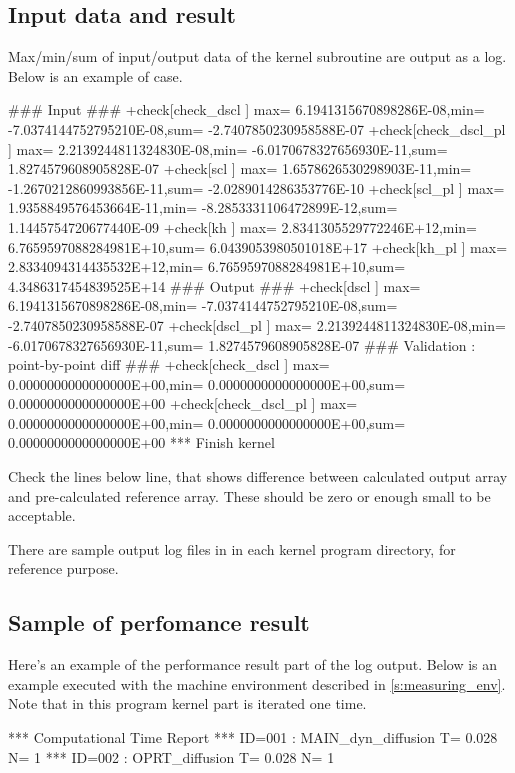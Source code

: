\subsection{Input data and result}

Max/min/sum of input/output data of the kernel subroutine are output as
a log.
%
Below is an example of  case.


\begin{LstLog}
 ### Input ###
 +check[check_dscl      ] max=  6.1941315670898286E-08,min= -7.0374144752795210E-08,sum= -2.7407850230958588E-07
 +check[check_dscl_pl   ] max=  2.2139244811324830E-08,min= -6.0170678327656930E-11,sum=  1.8274579608905828E-07
 +check[scl             ] max=  1.6578626530298903E-11,min= -1.2670212860993856E-11,sum= -2.0289014286353776E-10
 +check[scl_pl          ] max=  1.9358849576453664E-11,min= -8.2853331106472899E-12,sum=  1.1445754720677440E-09
 +check[kh              ] max=  2.8341305529772246E+12,min=  6.7659597088284981E+10,sum=  6.0439053980501018E+17
 +check[kh_pl           ] max=  2.8334094314435532E+12,min=  6.7659597088284981E+10,sum=  4.3486317454839525E+14
 ### Output ###
 +check[dscl            ] max=  6.1941315670898286E-08,min= -7.0374144752795210E-08,sum= -2.7407850230958588E-07
 +check[dscl_pl         ] max=  2.2139244811324830E-08,min= -6.0170678327656930E-11,sum=  1.8274579608905828E-07
 ### Validation : point-by-point diff ###
 +check[check_dscl      ] max=  0.0000000000000000E+00,min=  0.0000000000000000E+00,sum=  0.0000000000000000E+00
 +check[check_dscl_pl   ] max=  0.0000000000000000E+00,min=  0.0000000000000000E+00,sum=  0.0000000000000000E+00
 *** Finish kernel
\end{LstLog}

Check the lines below  line,
that shows difference between calculated output array and
pre-calculated reference array.
These should be zero or enough small to be acceptable.

There are sample output log files in 
in each kernel program directory, for reference purpose.


\subsection{Sample of perfomance result}

Here's an example of the performance result part of the log output.
Below is an example executed with the machine environment described in \autoref{s:measuring_env}.
%
Note that in this program kernel part is iterated one time.

\begin{LstLog}
 *** Computational Time Report
 *** ID=001 : MAIN_dyn_diffusion               T=     0.028 N=      1
 *** ID=002 : OPRT_diffusion                   T=     0.028 N=      1
\end{LstLog}

